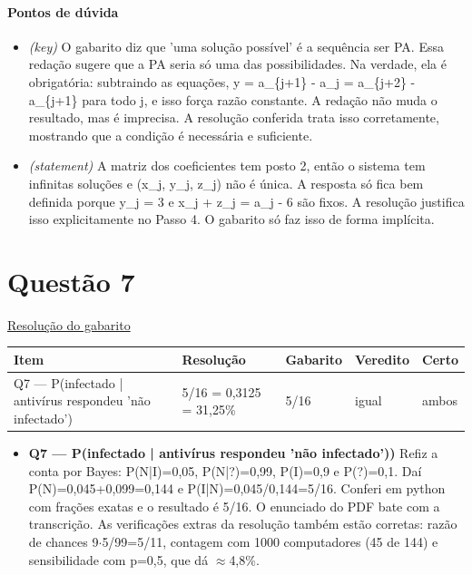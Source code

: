 \documentclass{article}%
\begin{document}
\paragraph{Pontos de dúvida}%
\begin{itemize}%
\item%
\textit{(key)} O gabarito diz que 'uma solução possível' é a sequência ser PA. Essa redação sugere que a PA seria só uma das possibilidades. Na verdade, ela é obrigatória: subtraindo as equações, y = a\_\{j+1\} - a\_j = a\_\{j+2\} - a\_\{j+1\} para todo j, e isso força razão constante. A redação não muda o resultado, mas é imprecisa. A resolução conferida trata isso corretamente, mostrando que a condição é necessária e suficiente.%
\item%
\textit{(statement)} A matriz dos coeficientes tem posto 2, então o sistema tem infinitas soluções e (x\_j, y\_j, z\_j) não é única. A resposta só fica bem definida porque y\_j = 3 e x\_j + z\_j = a\_j - 6 são fixos. A resolução justifica isso explicitamente no Passo 4. O gabarito só faz isso de forma implícita.%
\end{itemize}%
\section*{Questão 7}%
\href{https://poliedroresolve.sistemapoliedro.com.br/vestibulares/ime/2026/ime-2-fase-dia-1-23-10-2025-2-fase-dia-1/dissertativa-7-matematica-2-fase-dia-1-ime-2026}{Resolução do gabarito}\par\smallskip%
\begin{longtable}{@{}p{} p{} p{} p{} p{}@{}}\toprule Item & Resolução & Gabarito & Veredito & Certo \\ \midrule
Q7 --- P(infectado | antivírus respondeu 'não infectado') & 5/16 = 0,3125 = 31,25\% & 5/16 & igual & ambos \\
\bottomrule\end{longtable}%
\begin{itemize}%
\item%
\textbf{Q7 --- P(infectado | antivírus respondeu 'não infectado'))} Refiz a conta por Bayes: P(N|I)=0,05, P(N|?)=0,99, P(I)=0,9 e P(?)=0,1. Daí P(N)=0,045+0,099=0,144 e P(I|N)=0,045/0,144=5/16. Conferi em python com frações exatas e o resultado é 5/16. O enunciado do PDF bate com a transcrição. As verificações extras da resolução também estão corretas: razão de chances 9$\cdot$5/99=5/11, contagem com 1000 computadores (45 de 144) e sensibilidade com p=0,5, que dá $\approx$4,8\%.%
\end{itemize}%
\end{document}
